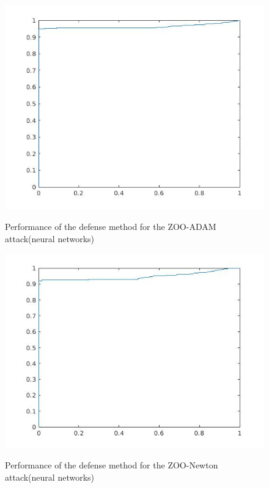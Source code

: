 \documentclass[a4paper]{article}
\begin{document}
\begin{figure}
\centering
\begin{minipage}[t]{0.45\textwidth}
\centering
\includegraphics[scale=0.3]{roc.jpg}
\label{roc}
\caption{Performance of the defense method for the ZOO-ADAM attack(neural networks)}
\end{minipage}
\begin{minipage}[t]{0.45\textwidth}
\centering
\includegraphics[scale=0.3]{roc_newton.jpg}
\label{roc}
\caption{Performance of the defense method for the ZOO-Newton attack(neural networks)}
\end{minipage}
\end{figure}
\end{document}
